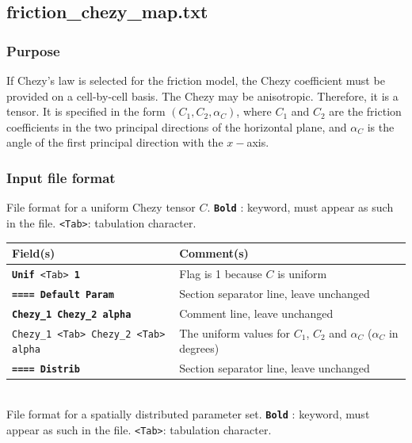 \subsection{friction\_chezy\_map.txt}
%
\subsubsection{Purpose}
If Chezy's law is selected for the friction model, the Chezy coefficient must be provided on a cell-by-cell basis. The Chezy may be anisotropic. Therefore, it is a tensor. It is specified in the form $(C_1 , C_2, \alpha_C)$, where $C_1$ and $C_2$ are the friction coefficients in the two principal directions of the horizontal plane, and $\alpha_C$ is the angle of the first principal direction with the $x-$axis.
%
\subsubsection{Input file format}
%
File format for a uniform Chezy tensor $C$.  \texttt{\textbf{Bold}} : keyword, must appear as such in the file. \texttt{<Tab>}: tabulation character. \\
    \begin{tabular}{p{6cm} | p{9cm}}
    \hline
    Field(s) & Comment(s) \\
    \hline  \hline
    \texttt{\textbf{Unif} <Tab> \textbf{1}} & Flag is 1 because $C$ is uniform \\ \hline
    \texttt{\textbf{==== Default Param}} & Section separator line, leave unchanged \\  \hline
    \texttt{\textbf{Chezy\_1 Chezy\_2 alpha}} & Comment line, leave unchanged \\  \hline
    \texttt{Chezy\_1 <Tab> Chezy\_2 <Tab> alpha} & The uniform values for $C_1$, $C_2$ and $\alpha_C$ ($\alpha_C$ in degrees) \\ \hline
    \texttt{\textbf{==== Distrib}} & Section separator line, leave unchanged \\  \hline
    \end{tabular}
%
\vspace{10mm} \\
%
File format for a spatially distributed parameter set.  \texttt{\textbf{Bold}} : keyword, must appear as such in the file. \texttt{<Tab>}: tabulation character. \\
